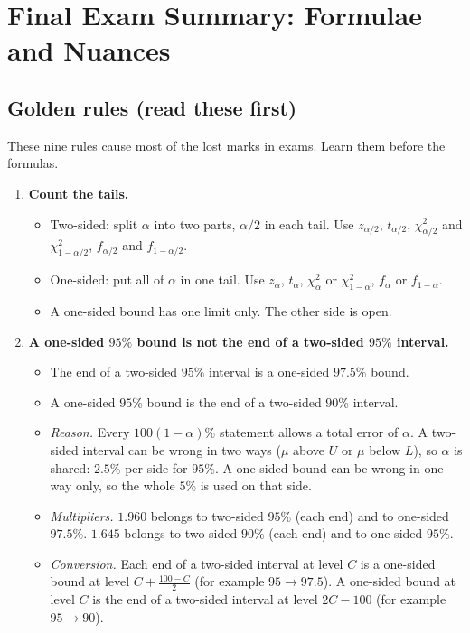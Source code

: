 \chapter{Final Exam Summary: Formulae and Nuances}

\section{Golden rules (read these first)}

These nine rules cause most of the lost marks in exams. Learn them before the formulas.

\begin{enumerate}
  \item \textbf{Count the tails.}
  \begin{itemize}
    \item Two-sided: split $\alpha$ into two parts, $\alpha/2$ in each tail. Use $z_{\alpha/2}$, $t_{\alpha/2}$, $\chi^2_{\alpha/2}$ and $\chi^2_{1-\alpha/2}$, $f_{\alpha/2}$ and $f_{1-\alpha/2}$.
    \item One-sided: put all of $\alpha$ in one tail. Use $z_\alpha$, $t_\alpha$, $\chi^2_\alpha$ or $\chi^2_{1-\alpha}$, $f_\alpha$ or $f_{1-\alpha}$.
    \item A one-sided bound has one limit only. The other side is open.
  \end{itemize}
  \item \textbf{A one-sided $95\%$ bound is not the end of a two-sided $95\%$ interval.}
  \begin{itemize}
    \item The end of a two-sided $95\%$ interval is a one-sided $97.5\%$ bound.
    \item A one-sided $95\%$ bound is the end of a two-sided $90\%$ interval.
    \item \emph{Reason.} Every $100(1-\alpha)\%$ statement allows a total error of $\alpha$. A two-sided interval can be wrong in two ways ($\mu$ above $U$ or $\mu$ below $L$), so $\alpha$ is shared: $2.5\%$ per side for $95\%$. A one-sided bound can be wrong in one way only, so the whole $5\%$ is used on that side.
    \item \emph{Multipliers.} $1.960$ belongs to two-sided $95\%$ (each end) and to one-sided $97.5\%$. $1.645$ belongs to two-sided $90\%$ (each end) and to one-sided $95\%$.
    \item \emph{Conversion.} Each end of a two-sided interval at level $C$ is a one-sided bound at level $C+\tfrac{100-C}{2}$ (for example $95\to97.5$). A one-sided bound at level $C$ is the end of a two-sided interval at level $2C-100$ (for example $95\to90$).

\end{itemize}
\end{enumerate}
